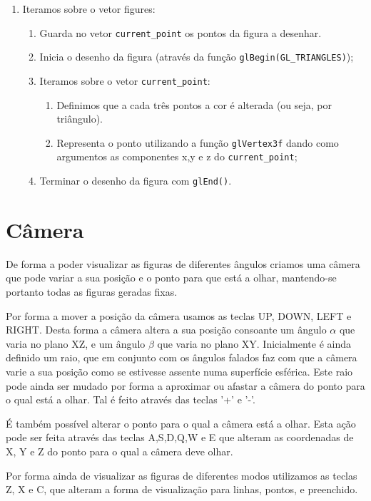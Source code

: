 \documentclass[a4paper]{article}
\begin{document}
\begin{enumerate}
	\item Iteramos sobre o vetor figures:
	 \begin{enumerate}
	 	\item Guarda no vetor \texttt{current\_point} os pontos da figura a desenhar.
	 	\item Inicia o desenho da figura (através da função \texttt{glBegin(GL\_TRIANGLES)});
	 	\item Iteramos sobre o vetor \texttt{current\_point}:
	 	\begin{enumerate}
	 		\item Definimos que a cada três pontos a cor é alterada (ou seja, por triângulo).
	 		\item Representa o ponto utilizando a função \texttt{glVertex3f} dando como argumentos as componentes x,y e z do \texttt{current\_point};
	 	\end{enumerate}
	 	\item Terminar o desenho da figura com \texttt{glEnd()}.
	 \end{enumerate}
\end{enumerate}

\section{Câmera}
\label{sec:camera}
De forma a poder visualizar as figuras de diferentes ângulos criamos uma câmera que pode variar a sua posição e o ponto para que está a olhar, mantendo-se portanto todas as figuras geradas fixas.

Por forma a mover a posição da câmera usamos as teclas UP, DOWN, LEFT e RIGHT. Desta forma a câmera altera a sua posição consoante um ângulo $\alpha$ que varia no plano XZ, e um ângulo $\beta$ que varia no plano XY. Inicialmente é ainda definido um raio, que em conjunto com os ângulos falados faz com que a câmera varie a sua posição como se estivesse assente numa superfície esférica. Este raio pode ainda ser mudado por forma a aproximar ou afastar a câmera do ponto para o qual está a olhar. Tal é feito através das teclas '+' e '-'.

É também possível alterar o ponto para o qual a câmera está a olhar. Esta ação pode ser feita através das teclas A,S,D,Q,W e E que alteram as coordenadas de X, Y e Z do ponto para o qual a câmera deve olhar.

Por forma ainda de visualizar as figuras de diferentes modos utilizamos as teclas Z, X e C, que alteram a forma de visualização para linhas, pontos, e preenchido.
\end{document}
